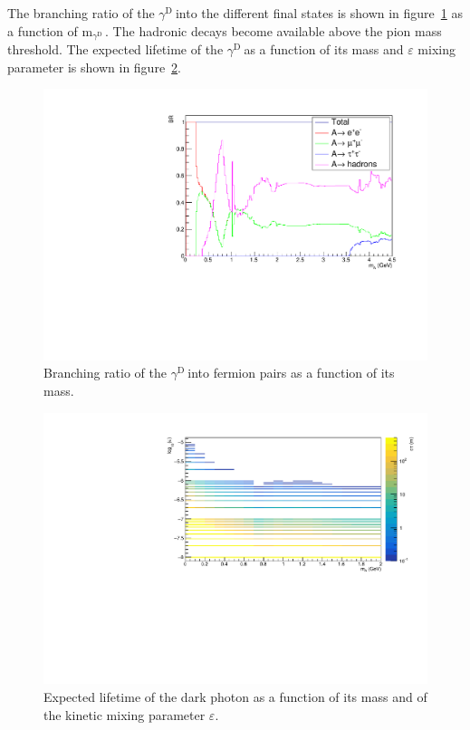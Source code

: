 \documentclass[12pt,a4paper]{article}
\newcommand{\mathDP}{\gamma^{\mathrm{D}}\ }
\newcommand{\DP}{$\mathDP$}
\newcommand{\mDP}{m$_{\mathDP}$}
\begin{document}
The branching ratio of the \DP into the different final states is
shown in figure~\ref{fig:decayBR} as a function of \mDP. The hadronic
decays become available above the pion mass threshold. The expected
lifetime of the \DP as a function of its mass and $\varepsilon$ mixing
parameter is shown in figure~\ref{fig:ctau}.


\begin{figure}[h!]
  \centering
\includegraphics[width=1.\textwidth]{figures/BRvsmass.pdf}
\caption{Branching ratio of the \DP into fermion pairs as a function
  of its mass.}
\label{fig:decayBR}
\end{figure}


\begin{figure}[h!]
  \centering
\includegraphics[width=1.\textwidth]{figures/ctauvsmassvseps.pdf}
\caption{Expected lifetime of the dark photon as a function of its mass and of the kinetic mixing parameter $\varepsilon$.}
\label{fig:ctau}
\end{figure}
\end{document}
